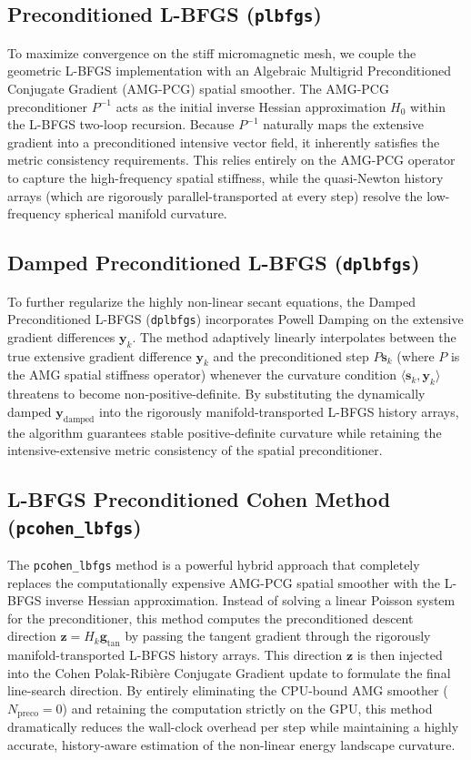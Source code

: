 \documentclass[11pt,a4paper]{article}
\begin{document}
\subsection{Preconditioned L-BFGS (\texttt{plbfgs})}
To maximize convergence on the stiff micromagnetic mesh, we couple the geometric L-BFGS implementation with an Algebraic Multigrid Preconditioned Conjugate Gradient (AMG-PCG) spatial smoother. The AMG-PCG preconditioner $P^{-1}$ acts as the initial inverse Hessian approximation $H_0$ within the L-BFGS two-loop recursion. Because $P^{-1}$ naturally maps the extensive gradient into a preconditioned intensive vector field, it inherently satisfies the metric consistency requirements. This relies entirely on the AMG-PCG operator to capture the high-frequency spatial stiffness, while the quasi-Newton history arrays (which are rigorously parallel-transported at every step) resolve the low-frequency spherical manifold curvature.

\subsection{Damped Preconditioned L-BFGS (\texttt{dplbfgs})}
To further regularize the highly non-linear secant equations, the Damped Preconditioned L-BFGS (\texttt{dplbfgs}) incorporates Powell Damping on the extensive gradient differences $\mathbf{y}_k$. The method adaptively linearly interpolates between the true extensive gradient difference $\mathbf{y}_k$ and the preconditioned step $P \mathbf{s}_k$ (where $P$ is the AMG spatial stiffness operator) whenever the curvature condition $\langle \mathbf{s}_k, \mathbf{y}_k \rangle$ threatens to become non-positive-definite. By substituting the dynamically damped $\mathbf{y}_{\text{damped}}$ into the rigorously manifold-transported L-BFGS history arrays, the algorithm guarantees stable positive-definite curvature while retaining the intensive-extensive metric consistency of the spatial preconditioner.

\subsection{L-BFGS Preconditioned Cohen Method (\texttt{pcohen\_lbfgs})}
The \texttt{pcohen\_lbfgs} method is a powerful hybrid approach that completely replaces the computationally expensive AMG-PCG spatial smoother with the L-BFGS inverse Hessian approximation. Instead of solving a linear Poisson system for the preconditioner, this method computes the preconditioned descent direction $\mathbf{z} = H_k \mathbf{g}_{\text{tan}}$ by passing the tangent gradient through the rigorously manifold-transported L-BFGS history arrays. This direction $\mathbf{z}$ is then injected into the Cohen Polak-Ribière Conjugate Gradient update to formulate the final line-search direction. By entirely eliminating the CPU-bound AMG smoother ($N_{\text{preco}} = 0$) and retaining the computation strictly on the GPU, this method dramatically reduces the wall-clock overhead per step while maintaining a highly accurate, history-aware estimation of the non-linear energy landscape curvature.
\end{document}
